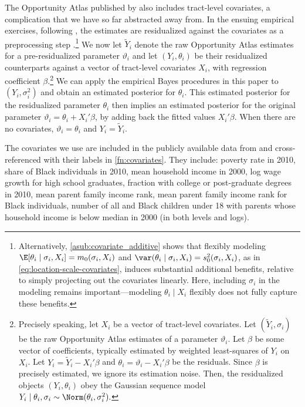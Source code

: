 \documentclass[12pt, reqno]{amsart}
\numberwithin{equation}{section}
\begin{document}
The Opportunity Atlas published by \citet{chetty2018opportunity}  also includes
tract-level covariates, a complication that we have so far abstracted away from. In the
ensuing empirical exercises, following \citet{bergman2019creating}, the estimates are
residualized against the covariates as a preprocessing
step  \citep{fay1979estimates}.\footnote{\label{fn:covariate_additive}Alternatively, \cref{asub:covariate_additive}
shows that flexibly modeling $\E[\theta_i \mid \sigma_i, X_i] = m_0(\sigma_i, X_i)$ and
$\var(\theta_i \mid \sigma_i, X_i) = s_0^2(\sigma_i, X_i)$, as in
\eqref{eq:location-scale-covariates}, induces substantial additional benefits, relative to
simply projecting out the covariates linearly. Here, including $\sigma_i$ in the modeling
remains important---modeling $\theta_i \mid X_i$ flexibly does not fully capture these
benefits.} We now let $\tilde Y_i$ denote the raw Opportunity
Atlas estimates for a
pre-residualized parameter $\vartheta_i$ and let $(Y_i, \theta_i)$ be their residualized
counterparts against a vector of tract-level covariates $X_i$, with regression coefficient
$\beta$.\footnote{Precisely speaking, let $X_i$ be a vector of tract-level covariates. Let
$(\tilde Y_i, \sigma_i)$ be the raw Opportunity Atlas estimates of a parameter
$\vartheta_i$. Let $\beta$ be some vector of coefficients, typically estimated by weighted
least-squares of $Y_i$ on $X_i$. Let $Y_i = \tilde Y_i - X_i'\beta$ and $\theta_i =
\vartheta_i - X_i'\beta$ be the residuals. Since $\beta$ is precisely estimated, we ignore
its estimation noise. Then, the residualized objects $(Y_i, \theta_i)$ obey the Gaussian
sequence model $Y_i
\mid \theta_i, \sigma_i
\sim \Norm(\theta_i,
\sigma_i^2).$  
}  We can apply the empirical Bayes procedures in this paper to
 $ (Y_i,
\sigma_i^2)$ and obtain an estimated posterior for $\theta_i$. This estimated posterior for
the residualized parameter $\theta_i$ then implies an estimated posterior for the original
parameter $\vartheta_i = \theta_i + X_i' \beta$, by adding back the fitted values
$X_i'\beta$. When there are no covariates,
$\vartheta_i = \theta_i$ and $Y_i = \tilde Y_i$.

 The covariates we use are included in the publicly available data from
 \citet{chetty2018opportunity} and cross-referenced with their labels in
 \cref{fn:covariates}. They include: poverty rate in 2010, share of Black individuals in
 2010, mean household income in 2000, log wage growth for high school graduates, fraction
 with college or post-graduate degrees in 2010, mean parent family income rank, mean
 parent family income rank for Black individuals, number of all and Black children under
 18 with parents whose household income is below median in 2000 (in both levels and logs).
\end{document}
